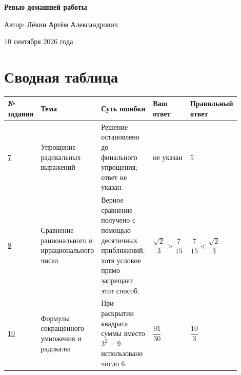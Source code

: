 \documentclass[12pt,a4paper]{article}
\begin{document}
\begin{titlepage}
\centering
\vspace*{0.27\textheight}

{\LARGE\bfseries Ревью домашней работы\par}

\vspace{1.6cm}

{\large Автор: Лёвин Артём Александрович\par}

\vspace{0.8cm}

{\large 10 сентября 2026 года\par}

\vfill


\end{titlepage}

\newpage
\section*{Сводная таблица}
\small

\begin{tabular}{@{}
>{\raggedright\arraybackslash}p{0.10\linewidth}
>{\raggedright\arraybackslash}p{0.17\linewidth}
>{\raggedright\arraybackslash}p{0.27\linewidth}
>{\raggedright\arraybackslash}p{0.17\linewidth}
>{\raggedright\arraybackslash}p{0.19\linewidth}
@{}}
\toprule
№ задания & Тема & Суть ошибки & Ваш ответ & Правильный ответ \\
\midrule
\hyperref[task:7]{7} &
Упрощение радикальных выражений &
Решение остановлено до финального упрощения; ответ не указан. &
не указан &
$5$ \\
\addlinespace
\hyperref[task:8]{8} &
Сравнение рационального и иррационального чисел &
Верное сравнение получено с помощью десятичных приближений, хотя условие прямо запрещает этот способ. &
$\dfrac{\sqrt2}{3}>\dfrac7{15}$ &
$\dfrac7{15}<\dfrac{\sqrt2}{3}$ \\
\addlinespace
\hyperref[task:10]{10} &
Формулы сокращённого умножения и радикалы &
При раскрытии квадрата суммы вместо $3^2=9$ использовано число $6$. &
$\dfrac{91}{30}$ &
$\dfrac{10}{3}$ \\
\bottomrule
\end{tabular}
\end{document}
